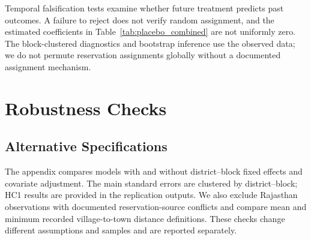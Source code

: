 \documentclass[12pt]{article}
\begin{document}
Temporal falsification tests examine whether future treatment predicts past outcomes. A failure to reject does not verify random assignment, and the estimated coefficients in Table~\ref{tab:placebo_combined} are not uniformly zero. The block-clustered diagnostics and bootstrap inference use the observed data; we do not permute reservation assignments globally without a documented assignment mechanism.

\begin{table}[!htbp]
\centering
\caption{Placebo Tests: Future Treatment Predicting Past Outcomes}
\label{tab:placebo_combined}

\end{table}
\FloatBarrier


\clearpage
\section{Robustness Checks}\label{sec:app_robust}

\subsection{Alternative Specifications}

The appendix compares models with and without district--block fixed effects and covariate adjustment. The main standard errors are clustered by district--block; HC1 results are provided in the replication outputs. We also exclude Rajasthan observations with documented reservation-source conflicts and compare mean and minimum recorded village-to-town distance definitions. These checks change different assumptions and samples and are reported separately.

\FloatBarrier

\begin{table}[!htbp]
    \centering
    \caption{Short-Term Effects with Census Covariates}
    \label{tab:shrug_covariates}
    
\end{table}
\FloatBarrier

\begin{table}[!htbp]
    \centering
    \caption{Short-Term Effects: Random Rotation Districts}
    \label{tab:short_term_random_rotation}
    
\end{table}
\FloatBarrier
\end{document}
